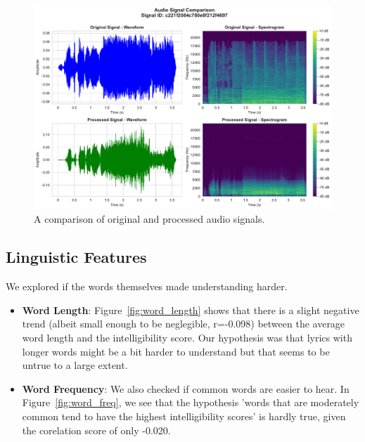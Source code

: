\documentclass[conference]{IEEEtran}
\begin{document}
\begin{figure}[htbp]
    \centering
    \includegraphics[width=\columnwidth]{plots_assignment_1/figure_2_signal_comparison.pdf}
    \caption{A comparison of original and processed audio signals.}
    \label{fig:signal_comp}
\end{figure}

\subsection{Linguistic Features}
We explored if the words themselves made understanding harder.
\begin{itemize}
    \item \textbf{Word Length}: Figure~\ref{fig:word_length} shows that there is a slight negative trend (albeit small enough to be neglegible, r=-0.098) between the average word length and the intelligibility score. Our hypothesis was that lyrics with longer words might be a bit harder to understand but that seems to be untrue to a large extent.
    \item \textbf{Word Frequency}: We also checked if common words are easier to hear. In Figure~\ref{fig:word_freq}, we see that the hypothesis 'words that are moderately common tend to have the highest intelligibility scores' is hardly true, given the corelation score of only -0.020. 
\end{itemize}
\end{document}
